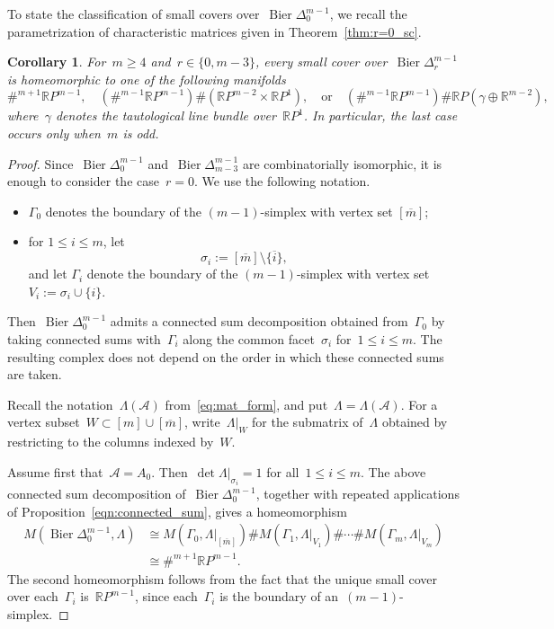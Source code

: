 \documentclass[11pt]{amsart}
\theoremstyle{plain}
\newtheorem{corollary}[theorem]{Corollary}
\numberwithin{equation}{section}
\theoremstyle{definition}
\newcommand{\R}{\mathbb{R}}
\newcommand{\cA}{\mathcal{A}}
\newcommand{\RP}{\mathbb{R}P}
\DeclareMathOperator{\Bier}{Bier}
\begin{document}
To state the classification of small covers over~$\Bier\Delta_{0}^{m-1}$, we recall the parametrization of characteristic matrices given in Theorem~\ref{thm:r=0_sc}.

\begin{corollary}\label{thm:connected_sum}
    For~$m\geq 4$ and~$r\in\{0,m-3\}$, every small cover over~$\Bier\Delta_{r}^{m-1}$ is homeomorphic to one of the following manifolds
    $$
        \#^{m+1}\RP^{m-1}, \quad (\#^{m-1}\RP^{m-1})\#(\RP^{m-2}\times \RP^1), \quad \text{or} \quad (\#^{m-1}\RP^{m-1})\#\RP(\gamma\oplus \R^{m-2}),
    $$
    where~$\gamma$ denotes the tautological line bundle over~$\RP^1$.
    In particular, the last case occurs only when~$m$ is odd.
\end{corollary}
\begin{proof}
    Since~$\Bier\Delta_{0}^{m-1}$ and~$\Bier\Delta_{m-3}^{m-1}$ are combinatorially isomorphic, it is enough to consider the case~$r=0$.
    We use the following notation.
    \begin{itemize}
        \item $\Gamma_0$ denotes the boundary of the $(m-1)$-simplex with vertex set $[\overline{m}]$;
        \item for $1\leq i\leq m$, let
            $$
                \sigma_i:=[\overline{m}]\setminus\{\overline{i}\},
            $$
            and let $\Gamma_i$ denote the boundary of the $(m-1)$-simplex with vertex set $V_i :=\sigma_i\cup\{i\}$.
    \end{itemize}
    Then~$\Bier\Delta_0^{m-1}$ admits a connected sum decomposition obtained from~$\Gamma_0$ by taking connected sums with~$\Gamma_i$ along the common facet~$\sigma_i$ for~$1\leq i\leq m$. 
    The resulting complex does not depend on the order in which these connected sums are taken.
    
    Recall the notation~$\Lambda(\cA)$ from~\eqref{eq:mat_form}, and put~$\Lambda=\Lambda(\cA)$.
    For a vertex subset~$W\subset [m]\cup[\overline{m}]$, write~$\Lambda|_W$ for the submatrix of~$\Lambda$ obtained by restricting to the columns indexed by~$W$.
    
    Assume first that~$\cA=A_0$.
    Then~$\det\Lambda|_{\sigma_i}=1$ for all~$1\leq i\leq m$.
    The above connected sum decomposition of~$\Bier\Delta_0^{m-1}$, together with repeated applications of Proposition~\ref{eqn:connected_sum}, gives a homeomorphism
    \begin{align*}
        M(\Bier\Delta_{0}^{m-1},\Lambda) &\cong  M(\Gamma_0,\Lambda|_{[\overline{m}]}) \# M(\Gamma_1,\Lambda|_{V_1}) \# \cdots \# M(\Gamma_m,\Lambda|_{V_m}) \\
        & \cong \#^{m+1}\RP^{m-1}.
    \end{align*}
    The second homeomorphism follows from the fact that the unique small cover over each~$\Gamma_i$ is~$\RP^{m-1}$, since each~$\Gamma_i$ is the boundary of an~$(m-1)$-simplex.
    

\end{proof}
\end{document}

